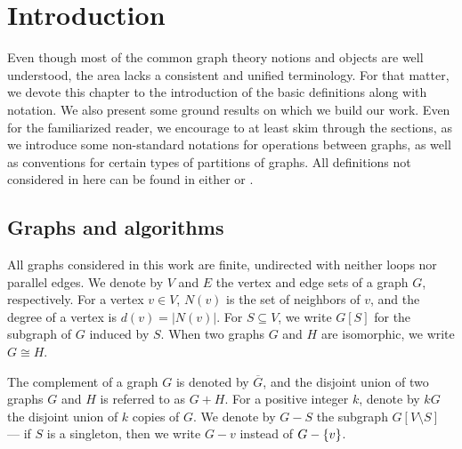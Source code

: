 \chapter{Introduction}
\label{cha:intro}

Even though most of the common graph theory notions and objects are well
understood, the area lacks a consistent and unified terminology. For that
matter, we devote this chapter to the introduction of the basic definitions
along with notation. We also present some ground results on which we build our
work. Even for the familiarized reader, we encourage to at least skim through
the sections, as we introduce some non-standard notations for operations between
graphs, as well as conventions for certain types of partitions of graphs. All
definitions not considered in here can be found in either \cite{bondy2008} or
\cite{diestel2017}.

\section{Graphs and algorithms}
\label{sec:graphs}

All graphs considered in this work are finite, undirected with neither loops nor
parallel edges. We denote by $V$ and $E$ the vertex and edge sets of a graph
$G$, respectively. For a vertex $v\in V$, $N(v)$ is the set of neighbors of $v$,
and the degree of a vertex is $d(v) = |N(v)|$. For $S\subseteq V$, we write
$G[S]$ for the subgraph of $G$ induced by $S$. When two graphs $G$ and $H$ are
isomorphic, we write $G \cong H$.

The complement of a graph $G$ is denoted by $\overline{G}$, and the disjoint
union of two graphs $G$ and $H$ is referred to as $G + H$. For a positive
integer $k$, denote by $kG$ the disjoint union of $k$ copies of $G$. We denote
by $G-S$ the subgraph $G[V\setminus S]$ --- if $S$ is a singleton, then we write
$G-v$ instead of $G-\left\{v\right\}$.

